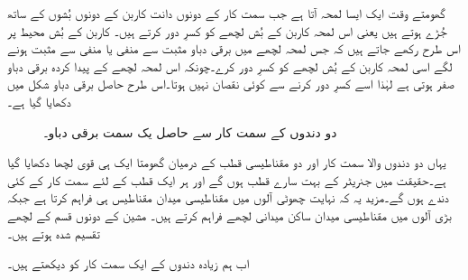 گھومتے وقت ایک ایسا لمحہ آتا ہے جب سمت کار کے دونوں دانت کاربن کے دونوں بُشوں کے ساتھ جُڑے ہوتے ہیں یعنی اس لمحہ کاربن کے بُش لچھے کو کسرِ دور کرتے ہیں۔ کاربن کے بُش محیط پر اس طرح رکھے جاتے ہیں کہ جس لمحہ لچھے میں برقی دباو مثبت سے منفی یا منفی سے مثبت ہونے لگے اسی لمحہ کاربن کے بُش لچھے کو کسرِ دور کرے۔چونکہ اس لمحہ لچھے کے پیدا کردہ برقی دباو صفر ہوتی ہے لہٰذا اسے کسرِ دور کرنے سے کوئی نقصان نہیں ہوتا۔اس طرح حاصل برقی دباو شکل   میں دکھایا گیا ہے۔
\begin{figure}
\centering
\caption{دو دندوں کے سمت کار سے حاصل یک سمت  برقی دباو۔}
\label{شکل_یکسمتی_دو_دندوں_کا_سمتکار}
\end{figure}


یہاں دو دندوں والا سمت کار اور دو مقناطیسی قطب کے درمیان گھومتا ایک ہی قوی لچھا دکھایا گیا ہے۔حقیقت میں جنریٹر کے بہت سارے قطب ہوں گے اور ہر ایک قطب کے لئے سمت کار کے کئی دندے ہوں گے۔مزید یہ کہ نہایت چھوٹی آلوں میں مقناطیسی میدان مقناطیس ہی فراہم کرتا ہے جبکہ بڑی آلوں میں مقناطیسی میدان ساکن میدانی لچھے فراہم کرتے ہیں۔ مشین کے دونوں قسم کے لچھے تقسیم شدہ ہوتے ہیں۔

اب ہم زیادہ دندوں کے ایک سمت کار کو دیکھتے ہیں۔


